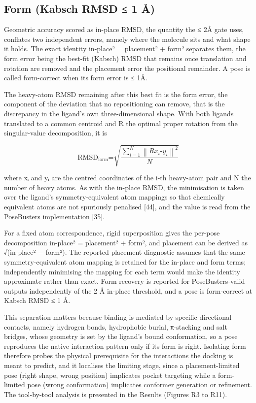 \hypertarget{form-kabsch-rmsd-1-uxe5}{%
\subsection{Form (Kabsch RMSD ≤ 1 Å)}\label{form-kabsch-rmsd-1-uxe5}}

Geometric accuracy scored as in-place RMSD, the quantity the ≤ 2Å gate uses, conflates two independent errors, namely where the molecule sits and what shape it holds. The exact identity in-place² = placement² + form² separates them, the form error being the best-fit (Kabsch) RMSD that remains once translation and rotation are removed and the placement error the positional remainder. A pose is called form-correct when its form error is ≤ 1Å.

The heavy-atom RMSD remaining after this best fit is the form error, the component of the deviation that no repositioning can remove, that is the discrepancy in the ligand's own three-dimensional shape. With both ligands translated to a common centroid and R the optimal proper rotation from the singular-value decomposition, it is

\[\text{RMSD}_{\text{form}}\text{=}\sqrt{\frac{\sum_{i = 1}^{N}\left\| Rx_{i}\text{-}y_{i} \right\|^{\text{2}}}{N}}\]

where xᵢ and yᵢ are the centred coordinates of the i-th heavy-atom pair and N the number of heavy atoms. As with the in-place RMSD, the minimisation is taken over the ligand's symmetry-equivalent atom mappings so that chemically equivalent atoms are not spuriously penalised {[}44{]}, and the value is read from the PoseBusters implementation {[}35{]}.

For a fixed atom correspondence, rigid superposition gives the per-pose decomposition in-place² = placement² + form², and placement can be derived as √(in-place² − form²). The reported placement diagnostic assumes that the same symmetry-equivalent atom mapping is retained for the in-place and form terms; independently minimising the mapping for each term would make the identity approximate rather than exact. Form recovery is reported for PoseBusters-valid outputs independently of the 2 Å in-place threshold, and a pose is form-correct at Kabsch RMSD ≤ 1 Å.

This separation matters because binding is mediated by specific directional contacts, namely hydrogen bonds, hydrophobic burial, π-stacking and salt bridges, whose geometry is set by the ligand's bound conformation, so a pose reproduces the native interaction pattern only if its form is right. Isolating form therefore probes the physical prerequisite for the interactions the docking is meant to predict, and it localises the limiting stage, since a placement-limited pose (right shape, wrong position) implicates pocket targeting while a form-limited pose (wrong conformation) implicates conformer generation or refinement. The tool-by-tool analysis is presented in the Results (Figures R3 to R11).

